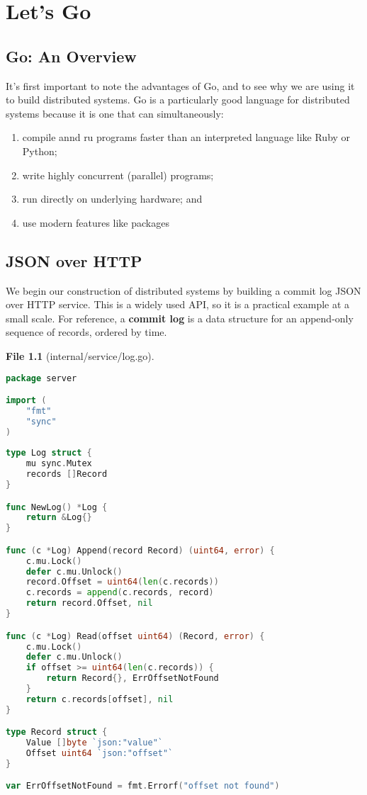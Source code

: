 \chapter{Let's Go}
\section{Go: An Overview}
\newtheorem{file}{File}

It's first important to note the advantages of Go, and to see why we are using it to build distributed systems. Go is a particularly good language for distributed systems because it is one that can simultaneously:
\begin{enumerate}[label=(\roman*)]
	\item compile annd ru programs faster than an interpreted language like Ruby or Python;
	\item write highly concurrent (parallel) programs;
	\item run directly on underlying hardware; and
	\item use modern features like packages
\end{enumerate}

\section{JSON over HTTP}
We begin our construction of distributed systems by building a commit log JSON over HTTP service. This is a widely used API, so it is a practical example at a small scale. For reference, a \textbf{commit log} is a data structure for an append-only sequence of records, ordered by time.


\begin{file}[internal/service/log.go] \:
	\begin{lstlisting}[language=Go]
package server

import (
	"fmt"
	"sync"
)
	
type Log struct {
	mu sync.Mutex
	records []Record
}

func NewLog() *Log {
	return &Log{}
}

func (c *Log) Append(record Record) (uint64, error) {
	c.mu.Lock()
	defer c.mu.Unlock()
	record.Offset = uint64(len(c.records))
	c.records = append(c.records, record)
	return record.Offset, nil
}

func (c *Log) Read(offset uint64) (Record, error) {
	c.mu.Lock()
	defer c.mu.Unlock()
	if offset >= uint64(len(c.records)) {
		return Record{}, ErrOffsetNotFound
	}
	return c.records[offset], nil
}

type Record struct {
	Value []byte `json:"value"`
	Offset uint64 `json:"offset"`
}

var ErrOffsetNotFound = fmt.Errorf("offset not found")
	\end{lstlisting}
\end{file}

